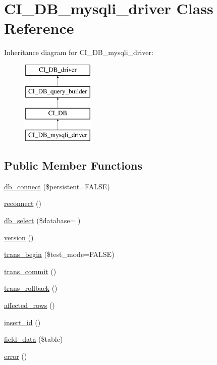 \hypertarget{class_c_i___d_b__mysqli__driver}{}\section{C\+I\+\_\+\+D\+B\+\_\+mysqli\+\_\+driver Class Reference}
\label{class_c_i___d_b__mysqli__driver}
Inheritance diagram for C\+I\+\_\+\+D\+B\+\_\+mysqli\+\_\+driver\+:\begin{figure}[H]
\begin{center}
\leavevmode
\includegraphics[height=4.000000cm]{class_c_i___d_b__mysqli__driver}
\end{center}
\end{figure}
\subsection*{Public Member Functions}
\begin{DoxyCompactItemize}
\item 
\hyperlink{class_c_i___d_b__mysqli__driver_a52bf595e79e96cc0a7c907a9b45aeb4d}{db\+\_\+connect} (\$persistent=F\+A\+L\+S\+E)
\item 
\hyperlink{class_c_i___d_b__mysqli__driver_a57c19c642ab3023e28d10c50f86ff0a8}{reconnect} ()
\item 
\hyperlink{class_c_i___d_b__mysqli__driver_a0f25caba4648e1a5ec88fcfe767d5f12}{db\+\_\+select} (\$database= \textquotesingle{}\textquotesingle{})
\item 
\hyperlink{class_c_i___d_b__mysqli__driver_a6080dae0886626b9a4cedb29240708b1}{version} ()
\item 
\hyperlink{class_c_i___d_b__mysqli__driver_a90e153cf190d273336d77cce930587e1}{trans\+\_\+begin} (\$test\+\_\+mode=F\+A\+L\+S\+E)
\item 
\hyperlink{class_c_i___d_b__mysqli__driver_af4fbdcdace4aa94a139b64877601fe9b}{trans\+\_\+commit} ()
\item 
\hyperlink{class_c_i___d_b__mysqli__driver_a53f76d4dfcd6ac04fb653982442aeef8}{trans\+\_\+rollback} ()
\item 
\hyperlink{class_c_i___d_b__mysqli__driver_a77248aaad33eb132c04cc4aa3f4bc8cb}{affected\+\_\+rows} ()
\item 
\hyperlink{class_c_i___d_b__mysqli__driver_a933f2cde8dc7f87875e257d0a4902e99}{insert\+\_\+id} ()
\item 
\hyperlink{class_c_i___d_b__mysqli__driver_a90355121e1ed009e0efdbd544ab56efa}{field\+\_\+data} (\$table)
\item 
\hyperlink{class_c_i___d_b__mysqli__driver_a43b8d30b879d4f09ceb059b02af2bc02}{error} ()
\end{DoxyCompactItemize}
